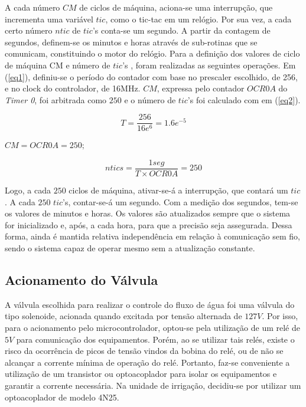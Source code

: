 \documentclass[conference]{IEEEtran}
\begin{document}
A cada número $CM$ de ciclos de máquina, aciona-se uma interrupção, que incrementa uma variável $tic$, como o tic-tac em um relógio. Por sua vez, a cada certo número $ntic$ de $tic$’s conta-se um segundo. A partir da contagem de segundos, definem-se os minutos e horas através de sub-rotinas que se comunicam, constituindo o motor do relógio. Para a definição dos valores de ciclo de máquina CM e número de $tic$’s , foram realizadas as seguintes operações. Em (\ref{eq1}), definiu-se o período do contador com base no prescaler escolhido, de 256, e no clock do controlador, de 16MHz. $CM$, expressa pelo contador $OCR0A$ do \textit{Timer 0}, foi arbitrada como $250$ e o número de $tic$'s foi calculado com em (\ref{eq2}).

\begin{equation}
T = \frac{256}{16e^6} = 1.6e^{-5}
\label{eq1}
\end{equation}

$CM = OCR0A = 250;$

\begin{equation}
ntics = \frac{1seg}{T\times OCR0A} = 250
\label{eq2}
\end{equation}

Logo, a cada $250$ ciclos de máquina, ativar-se-á a interrupção, que contará um $tic$. A cada $250$ $tic$’s, contar-se-á um segundo. Com a medição dos segundos, tem-se os valores de minutos e horas. Os valores são atualizados sempre que o sistema for inicializado e, após, a cada hora, para que a precisão seja assegurada. Dessa forma, ainda é mantida relativa independência em relação à comunicação sem fio, sendo o sistema capaz de operar mesmo sem a atualização constante.

\subsection{Acionamento do Válvula}

A válvula escolhida para realizar o controle do fluxo de água foi uma válvula do tipo solenoide, acionada quando excitada por tensão alternada de $127 V$. Por isso, para o acionamento pelo microcontrolador, optou-se pela utilização de um relé de $5 V$ para comunicação dos equipamentos. Porém, ao se utilizar tais relés, existe o risco da ocorrência de picos de tensão vindos da bobina do relé, ou de não se alcançar a corrente mínima de operação do relé. Portanto, faz-se conveniente a utilização de um transistor ou optoacoplador para isolar os equipamentos e garantir a corrente necessária. Na unidade de irrigação, decidiu-se por utilizar um optoacoplador de modelo 4N25.
\end{document}
